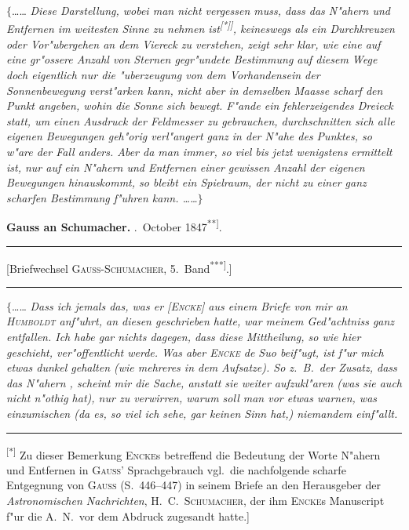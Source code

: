 \documentclass[12pt,a4paper]{article}
\theoremstyle{plain}
\theoremstyle{definition}
\theoremstyle{remark}
\begin{document}
{\vspace{1em}
\noindent
$\{$\ldots{}\ldots{} {\itshape Diese Darstellung, wobei man nicht vergessen muss, dass das N"ahern und Entfernen im weitesten Sinne zu nehmen ist\textsuperscript{[*]]}, keineswegs als ein Durchkreuzen oder Vor"ubergehen an dem {\itshape Viereck} zu verstehen, zeigt sehr klar, wie eine auf eine gr"ossere Anzahl von Sternen gegr"undete Bestimmung auf diesem Wege doch eigentlich nur die "uberzeugung von dem Vorhandensein der Sonnenbewegung verst"arken kann, nicht aber in demselben Maasse scharf den Punkt angeben, wohin die Sonne sich bewegt. F"ande ein fehlerzeigendes Dreieck statt, um einen Ausdruck der Feldmesser zu gebrauchen, durchschnitten sich alle eigenen Bewegungen geh"orig verl"angert ganz in der N"ahe des Punktes, so w"are der Fall anders. Aber da man immer, so viel bis jetzt wenigstens ermittelt ist, nur auf ein N"ahern und Entfernen einer gewissen Anzahl der eigenen Bewegungen hinauskommt, so bleibt ein Spielraum, der nicht zu einer ganz scharfen Bestimmung f"uhren kann. \ldots{}\ldots{}$\}$}

\vspace{1em}
\begin{center}
\textbf{Gauss an Schumacher.} .\ October 1847\textsuperscript{**]}.
\end{center}

\rule{\textwidth}{0.4pt}
\begin{center}
\small
[Briefwechsel \textsc{Gauss-Schumacher}, 5.\ Band\textsuperscript{***]}.]
\end{center}
\rule{\textwidth}{0.4pt}

\noindent
$\{$\ldots{}\ldots{} {\itshape Dass ich jemals das, was er [\textsc{Encke}] aus einem Briefe von mir an} \\ {\itshape \textsc{Humboldt} anf"uhrt, an diesen geschrieben hatte, war meinem Ged"achtniss ganz entfallen. Ich habe gar nichts dagegen, dass diese Mittheilung, so wie hier geschieht, ver"offentlicht werde. Was aber \textsc{Encke} de Suo beif"ugt, ist f"ur mich etwas dunkel gehalten (wie mehreres in dem Aufsatze). So z.\ B.\ der Zusatz, dass das N"ahern \grq{}, scheint mir die Sache, anstatt sie weiter aufzukl"aren (was sie auch nicht n"othig hat), nur zu verwirren, warum soll man vor etwas warnen, was einzumischen (da es, so viel ich sehe, gar keinen Sinn hat,) niemandem einf"allt.}

\rule{\textwidth}{0.4pt}
{\small
\textsuperscript{[*]} Zu dieser Bemerkung \textsc{Encke}s betreffend die Bedeutung der Worte \glq{}N"ahern\grq{} und \glq{}Entfernen\grq{} in \textsc{Gauss}' Sprachgebrauch vgl.\ die nachfolgende scharfe Entgegnung von \textsc{Gauss} (S.\ 446--447) in seinem Briefe an den Herausgeber der {\itshape Astronomischen Nachrichten}, H.\ C.\ \textsc{Schumacher}, der ihm \textsc{Encke}s Manuscript f"ur die A.\ N.\ vor dem Abdruck zugesandt hatte.]

}}
\end{document}
